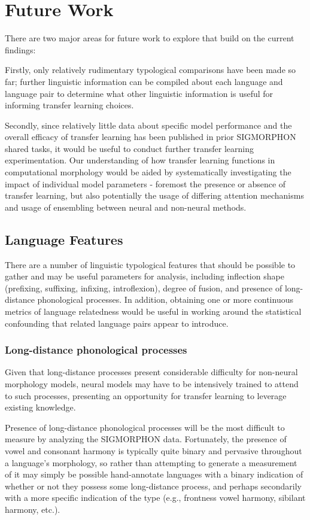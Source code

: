 \chapter{Future Work}

There are two major areas for future work to explore that build on the current findings:

Firstly, only relatively rudimentary typological comparisons have been made so far; further linguistic information can be compiled about each language and language pair to determine what other linguistic information is useful for informing transfer learning choices. 

Secondly, since relatively little data about specific model performance and the overall efficacy of transfer learning has been published in prior SIGMORPHON shared tasks, it would be useful to conduct further transfer learning experimentation. Our understanding of how transfer learning functions in computational morphology would be aided by systematically investigating the impact of individual model parameters - foremost the presence or absence of transfer learning, but also potentially the usage of differing attention mechanisms and usage of ensembling between neural and non-neural methods.

\section{Language Features}

There are a number of linguistic typological features that should be possible to gather and may be useful parameters for analysis, including inflection shape (prefixing, suffixing, infixing, introflexion), degree of fusion, and presence of long-distance phonological processes. In addition, obtaining one or more continuous metrics of language relatedness would be useful in working around the statistical confounding that related language pairs appear to introduce.

\subsection{Long-distance phonological processes}

Given that long-distance processes present considerable difficulty for non-neural morphology models, neural models may have to be intensively trained to attend to such processes, presenting an opportunity for transfer learning to leverage existing knowledge.

Presence of long-distance phonological processes will be the most difficult to measure by analyzing the SIGMORPHON data. Fortunately, the presence of vowel and consonant harmony is typically quite binary and pervasive throughout a language's morphology, so rather than attempting to generate a measurement of it may simply be possible hand-annotate languages with a binary indication of whether or not they possess some long-distance process, and perhaps secondarily with a more specific indication of the type (e.g., frontness vowel harmony, sibilant harmony, etc.).

